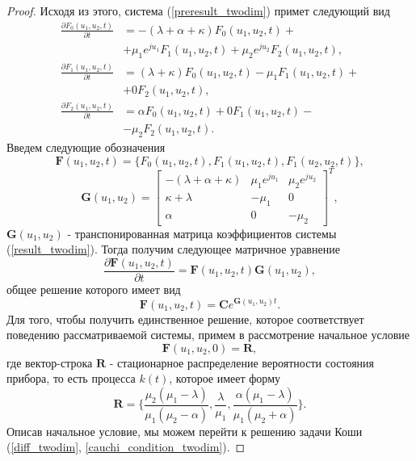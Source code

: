 \begin{proof}
	Исходя из этого, система (\ref{preresult_twodim}) примет следующий вид
	\begin{equation} \label{result_twodim}
		\begin{split}
			\frac{{\partial F_{0}(u_{1},u_{2},t)}}{{\partial t}} &= -(\lambda + \alpha+ \kappa)F_{0}(u_{1},u_{2},t) + \\  &+ \mu_{1} e^{ju_{1}}F_{1}(u_{1},u_{2},t) + \mu_{2}e^{ju_{2}}F_{2}(u_{1},u_{2},t) ,
			\\
			\frac{{\partial F_{1}(u_{1},u_{2},t)}}{{\partial t}} &= (\lambda + \kappa)F_{0}(u_{1},u_{2},t) -  
			\mu_{1}F_{1}(u_{1},u_{2},t) +\\  &+  0F_{2}(u_{1},u_{2},t) ,
			\\
			\frac{{\partial F_{2}(u_{1},u_{2},t)}}{{\partial t}} &= \alpha F_{0}(u_{1},u_{2},t)   +  0F_{1}(u_{1},u_{2},t) -\\  &- \mu_{2}F_{2}(u_{1},u_{2},t).
		\end{split}
	\end{equation}  
	Введем следующие обозначения
	\begin{equation*}
		\boldsymbol{F}(u_{1},u_{2},t) = \{F_{0}(u_{1},u_{2},t),F_{1}(u_{1},u_{2},t),F_{1}(u_{2},u_{2},t)\},
	\end{equation*}  
	\begin{equation*}
		\boldsymbol{G}(u_{1},u_{2})=\begin{bmatrix}
			-(\lambda + \alpha + \kappa) & \mu_{1}e^{ju_{1}} &  \mu_{2}e^{ju_{2}}\\
			\kappa+\lambda & -\mu_{1} & 0\\
			\alpha & 	0 &	-\mu_{2}
		\end{bmatrix}^{T},
	\end{equation*}
	$\boldsymbol{G}(u_{1},u_{2})$ - транспонированная матрица коэффициентов системы (\ref{result_twodim}).
	Тогда получим следующее матричное уравнение
	\begin{equation*}
		\frac{{\partial \boldsymbol{F}(u_{1},u_{2},t)}}{{\partial t}} =\boldsymbol{F}(u_{1},u_{2},t)\boldsymbol{G}(u_{1},u_{2}),
	\end{equation*}
	общее решение которого имеет вид
	\begin{equation} \label{diff_twodim}
		\boldsymbol{F}(u_{1},u_{2},t)=\boldsymbol{C}e^{\boldsymbol{G}(u_{1},u_{2})t}.
	\end{equation}
	Для того, чтобы получить единственное решение, которое соответствует поведению рассматриваемой системы, примем в рассмотрение начальное условие
	\begin{equation} \label{cauchi_condition_twodim}
		\boldsymbol{F}(u_{1},u_{2},0)=\boldsymbol{R},
	\end{equation}
	где вектор-строка $\boldsymbol{R}$ - стационарное распределение вероятности состояния прибора, то есть процесса $k(t)$, которое имеет форму \cite{nazarov2017asymptotic}
	\begin{equation*}
		\boldsymbol{R}=\{\frac{\mu_{2}(\mu_{1} - \lambda)}{\mu_{1}(\mu_{2} - \alpha)},\frac{\lambda}{\mu_{1}},\frac{\alpha(\mu_{1} - \lambda)}{\mu_{1}(\mu_{2} + \alpha)}\}.
	\end{equation*}
	Описав начальное условие, мы можем перейти к решению задачи Коши (\ref{diff_twodim}, \ref{cauchi_condition_twodim}).
	

\end{proof}
